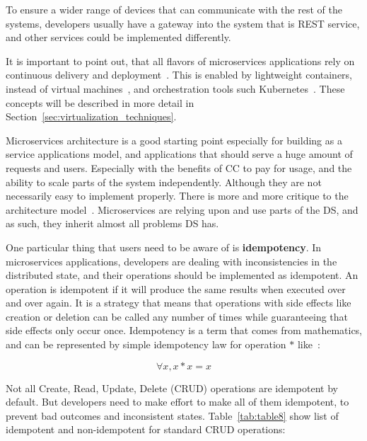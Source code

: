 \noindent
To ensure a wider range of devices that can communicate with the rest of the systems, developers usually have a gateway into the system that is REST service, and other services could be implemented differently.

It is important to point out, that all flavors of microservices applications rely on continuous delivery and deployment~\cite{7436659}. This is enabled by lightweight containers, instead of virtual machines~\cite{FelterFRR15}, and orchestration tools such Kubernetes~\cite{BurnsGOBW16}. These concepts will be described in more detail in Section~\ref{sec:virtualization_techniques}.

Microservices architecture is a good starting point especially for building as a service applications model, and applications that should serve a huge amount of requests and users. Especially with the benefits of CC to pay for usage, and the ability to scale parts of the system independently.  Although they are not necessarily easy to implement properly. There is more and more critique to the architecture model~\cite{SoldaniTH18}. Microservices are relying upon and use parts of the DS, and as such, they inherit almost all problems DS has. 

One particular thing that users need to be aware of is \textbf{idempotency}. In microservices applications, developers are dealing with inconsistencies in the distributed state, and their operations should be implemented as idempotent. An operation is idempotent if it will produce the same results when executed over and over again. It is a strategy that means that operations with side effects like creation or deletion can be called any number of times while guaranteeing that side effects only occur once. Idempotency is a term that comes from mathematics, and can be represented by simple idempotency law for operation $*$ like~\cite{gratzer2002general}:

\begin{equation}\label{form:idempotency_law}
	\forall x, x * x = x
\end{equation}

\noindent
Not all Create, Read, Update, Delete (CRUD) operations are idempotent by default. But developers need to make effort to make all of them idempotent, to prevent bad outcomes and inconsistent states. Table~\ref{tab:table8} show list of idempotent and non-idempotent for standard CRUD operations:

